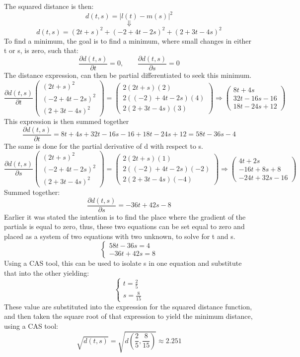 The squared distance is then:
\[d(t,s) = |l(t) - m(s)|^2\]
\[\Downarrow\]
\[d(t,s) = (2t+s)^2 + (-2+4t-2s)^2 + (2+3t-4s)^2\]
To find a minimum, the goal is to find a minimum, where small changes in either t or s, is zero, such that:
\[
\frac{\partial d(t,s)}{\partial t} = 0, \qquad
\frac{\partial d(t,s)}{\partial s} = 0
\]
The distance expression, can then be partial differentiated to seek this minimum.
\[
\frac{\partial d(t,s)}{\partial t} 
\begin{pmatrix}
    (2t+s)^2 \\
    (-2+4t-2s)^2 \\
    (2+3t-4s)^2
\end{pmatrix}
= 
\begin{pmatrix}
    2(2t+s)(2)\\
    2\left((-2)+4t-2s\right)(4)\\
    2(2+3t-4s)(3)
\end{pmatrix}
\Rightarrow
\begin{pmatrix}
    8t+4s\\
    32t-16s-16\\
    18t-24s+12
\end{pmatrix}
\]
This expression is then summed together
\[
\frac{\partial d(t,s)}{\partial t} =
8t+4s + 32t-16s-16 + 18t-24s+12 = 58t-36s-4
\]
The same is done for the partial derivative of d with respect to s.
\[
\frac{\partial d(t,s)}{\partial s} 
\begin{pmatrix}
    (2t+s)^2 \\
    (-2+4t-2s)^2 \\
    (2+3t-4s)^2
\end{pmatrix}
= 
\begin{pmatrix}
    2(2t+s)(1)\\
    2\left((-2)+4t-2s\right)(-2)\\
    2(2+3t-4s)(-4)
\end{pmatrix}
\Rightarrow
\begin{pmatrix}
    4t+2s\\
    -16t+8s+8\\
    -24t+32s-16
\end{pmatrix}
\]
Summed together:
\[
\frac{\partial d(t,s)}{\partial s} =
-36t+42s-8
\]
Earlier it was stated the intention is to find the place where the
gradient of the partials is equal to zero, thus, these two equations can
be set equal to zero and placed as a system of two equations with
two unknown, to solve for t and s.
\[
\begin{cases}
    58t-36s=4 \\
    -36t+42s=8
\end{cases}
\]
Using a CAS tool, this can be used to isolate s in one equation
and substitute that into the other yielding:
\[
\begin{cases}
    t = \frac{2}{5}\\
    s = \frac{8}{15}
\end{cases}
\]
These value are substituted into the expression for the squared
distance function, and then taken the square root of that expression
to yield the minimum distance, using a CAS tool:
\[\sqrt{d(t,s)} = \sqrt{d\left(\frac{2}{5}, \frac{8}{15}\right)} \approx 2.251 \]